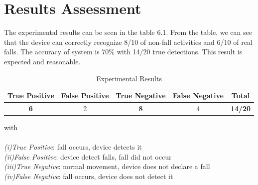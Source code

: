 \documentclass[letterpaper,12pt,titlepage,oneside,final]{book}
\begin{document}
\section{Results Assessment}
The experimental results can be seen in the table 6.1. From the table, we can see that the device can correctly recognize 8/10 of non-fall activities and 6/10 of real falls. The accuracy of system is 70\% with 14/20 true detections. This result is expected and reasonable. 
\begin{table}[h]
	\begin{center}
		\begin{tabular}{ |c|c|c|c|c| } 
			\hline
			True Positive & False Positive & True Negative & False Negative & Total\\
			\hline
			\textbf{6} & 2 & \textbf{8}& 4& \textbf{14/20}\\
			\hline
		\end{tabular}
		\caption{Experimental Results}
		\label{table:1}
	\end{center}
with\\
\\
	\textit{(i)True Positive}: fall occurs, device detects it\\
	\textit{(ii)False Positive}: device detect falls, fall did not occur\\
	\textit{(iii)True Negative}: normal movement, device does not declare a fall\\
	\textit{(iv)False Negative}: fall occurs, device does not detect it	\\
\end{table}\par
\end{document}
